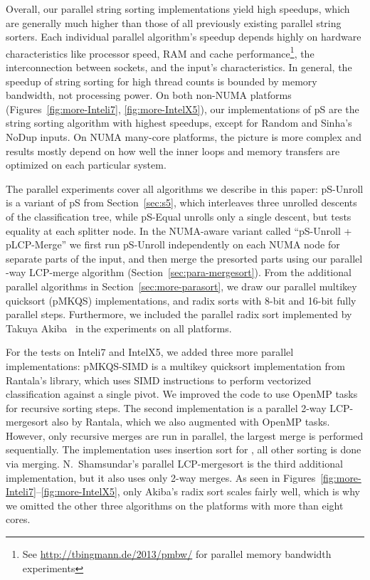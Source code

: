 \documentclass[a4paper]{myjournal}
\begin{document}
Overall, our parallel string sorting implementations yield high speedups, which
are generally much higher than those of all previously existing parallel string
sorters. Each individual parallel algorithm's speedup depends highly on hardware
characteristics like processor speed, RAM and cache performance\footnote{See
  \url{http://tbingmann.de/2013/pmbw/} for parallel memory bandwidth
  experiments}, the interconnection between sockets, and the input's
characteristics. In general, the speedup of string sorting for high thread
counts is bounded by memory bandwidth, not processing power.  On both non-NUMA
platforms (Figures~\ref{fig:more-Inteli7}, \ref{fig:more-IntelX5}), our
implementations of pS are the string sorting algorithm with highest
speedups, except for Random and Sinha's NoDup inputs.  On NUMA many-core
platforms, the picture is more complex and results mostly depend on how well the
inner loops and memory transfers are optimized on each particular system.

The parallel experiments cover all algorithms we describe in this paper:
pS-Unroll is a variant of pS from Section~\ref{sec:s5}, which
interleaves three unrolled descents of the classification tree, while
pS-Equal unrolls only a single descent, but tests equality at each splitter
node. In the NUMA-aware variant called ``pS-Unroll + pLCP-Merge'' we first
run pS-Unroll independently on each NUMA node for separate parts of the
input, and then merge the presorted parts using our parallel -way LCP-merge
algorithm (Section~\ref{sec:para-mergesort}). From the additional parallel
algorithms in Section~\ref{sec:more-parasort}, we draw our parallel multikey
quicksort (pMKQS) implementations, and radix sorts with 8-bit and 16-bit fully
parallel steps.  Furthermore, we included the parallel radix sort implemented by
Ta\-kuya Akiba~\cite{akiba2011radixsort} in the experiments on all platforms.

For the tests on Inteli7 and IntelX5, we added three more parallel
implementations: pMKQS-SIMD is a multikey quicksort implementation from
Rantala's library, which uses SIMD instructions to perform vectorized
classification against a single pivot. We improved the code to use OpenMP tasks
for recursive sorting steps. The second implementation is a parallel 2-way
LCP-mergesort also by Rantala, which we also augmented with OpenMP
tasks. However, only recursive merges are run in parallel, the largest merge is
performed sequentially. The implementation uses insertion sort for , all other sorting is done via merging. N.\ Shamsundar's parallel
LCP-mergesort is the third additional implementation, but it also uses only
2-way merges.  As seen in Figures~\ref{fig:more-Inteli7}--\ref{fig:more-IntelX5},
only Akiba's radix sort scales fairly well, which is why we omitted the other
three algorithms on the platforms with more than eight cores.
\end{document}
